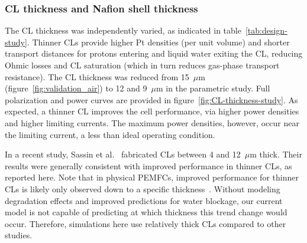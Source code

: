 \documentclass[final,3p,times,twocolumn]{elsarticle}    %
\newcommand{\crr}[1]{\color{red} #1 \color{black}}
\begin{document}
\subsubsection{CL thickness and Nafion shell thickness}
The CL thickness was independently varied, as indicated in table~\ref{tab:design-study}. Thinner CLs provide higher Pt densities (per unit volume) and shorter transport distances for protons entering and liquid water exiting the CL, reducing Ohmic losses and CL saturation (which in turn reduces gas-phase transport resistance). The CL thickness was reduced from 15~$\mu$m (figure~\ref{fig:validation_air}) to 12 and 9~$\mu$m in the parametric study. Full polarization and power curves are provided in figure~\ref{fig:CL-thickness-study}. As expected, a thinner CL improves the cell performance, via higher power densities and higher limiting currents. The maximum power densities, however, occur near the limiting current, a less than ideal operating condition. 

\crr{In a recent study, Sassin et al.~\cite{bib:sassin_2019} fabricated CLs between 4 and 12~$\mu$m thick. Their results were generally consistent with improved performance in thinner CLs, as reported here.
Note that in physical PEMFCs, improved performance for thinner CLs is likely only observed down to a specific thickness~\cite{bib:sassin_2019}. Without modeling degradation effects and improved predictions for water blockage, our current model is not capable of predicting at which thickness this trend change would occur. Therefore, simulations here use relatively thick CLs compared to other studies.}
\end{document}
